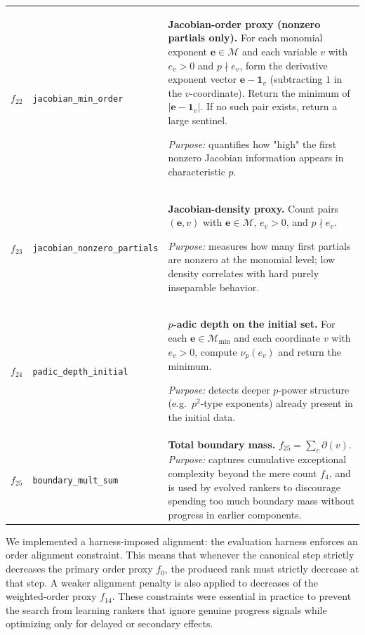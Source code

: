 \documentclass[11pt]{amsart}
\begin{document}
\begin{longtable}{@{}r p{} p{}@{}}
$f_{22}$ &
\texttt{jacobian\_min\_order} &
\textbf{Jacobian-order proxy (nonzero partials only).}
For each monomial exponent $\mathbf{e}\in\mathcal M$ and each variable $v$ with $e_v>0$ and $p\nmid e_v$, form the derivative
exponent vector $\mathbf{e}-\mathbf{1}_v$ (subtracting $1$ in the $v$-coordinate). Return the minimum of $|\mathbf{e}-\mathbf{1}_v|$.
If no such pair exists, return a large sentinel.

\emph{Purpose:} quantifies how "high" the first nonzero Jacobian information appears in characteristic $p$. \\[0.3em]

$f_{23}$ &
\texttt{jacobian\_nonzero\_partials} &
\textbf{Jacobian-density proxy.}
Count pairs $(\mathbf{e},v)$ with $\mathbf{e}\in\mathcal M$, $e_v>0$, and $p\nmid e_v$.

\emph{Purpose:} measures how many first partials are nonzero at the monomial level; low density correlates with
hard purely inseparable behavior. \\[0.3em]

$f_{24}$ &
\texttt{padic\_depth\_initial} &
\textbf{$p$-adic depth on the initial set.}
For each $\mathbf{e}\in\mathcal M_{\min}$ and each coordinate $v$ with $e_v>0$, compute $\nu_p(e_v)$ and return the minimum.

\emph{Purpose:} detects deeper $p$-power structure (e.g.\ $p^2$-type exponents) already present in the initial data. \\[0.3em]

$f_{25}$ &
\texttt{boundary\_mult\_sum} &
\textbf{Total boundary mass.}
 $f_{25}=\sum_v \partial(v)$.
\emph{Purpose:} captures cumulative exceptional complexity beyond the mere count $f_4$, and is used by evolved rankers to discourage spending too much boundary mass without progress in earlier components. \\

\bottomrule
\end{longtable}

We implemented a harness-imposed alignment:
the evaluation harness enforces an order alignment constraint. This means that whenever the canonical step strictly decreases
the primary order proxy $f_0$, the produced rank must strictly decrease at that step.
A weaker alignment penalty is also applied to decreases of the weighted-order proxy $f_{14}$.
These constraints were essential in practice to prevent the search from learning rankers that ignore genuine
progress signals while optimizing only for delayed or secondary effects.
\end{document}
